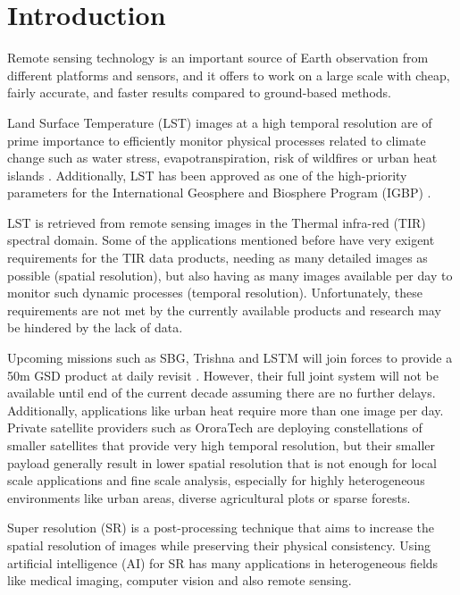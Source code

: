 \section{Introduction} \label{sec:intro}


Remote sensing technology is an important source of Earth observation from different platforms
and sensors, and it offers to work on a large scale with cheap, fairly accurate, and faster results compared to ground-based methods.

Land Surface Temperature (LST) images at a high temporal resolution are of prime importance to efficiently monitor physical processes related to climate change such as water stress, evapotranspiration, risk of wildfires or urban heat islands \cite{lst2005}.
Additionally, LST has been approved as one of the high-priority parameters for the International Geosphere and Biosphere Program (IGBP) \cite{townshend94}.

LST is retrieved from remote sensing images in the Thermal infra-red (TIR) spectral domain.  
Some of the applications mentioned before have very exigent requirements for the TIR data products, needing as many detailed images as possible (spatial resolution), but also having as many images available per day to monitor such dynamic processes (temporal resolution).
Unfortunately, these requirements are not met by the currently available products and research may be hindered by the lack of data.

Upcoming missions such as SBG, Trishna and LSTM will join forces to provide a 50m GSD product at daily revisit \cite{author2023thermal}. However, their full joint system will not be available until end of the current decade assuming there are no further delays. Additionally, applications like urban heat require more than one image per day.
Private satellite providers such as OroraTech are deploying constellations of smaller satellites that provide very high temporal resolution, but their smaller payload generally result in lower spatial resolution that is not enough for local scale applications and fine scale analysis, especially for highly heterogeneous environments like urban areas, diverse agricultural plots or sparse forests.

Super resolution (SR) is a post-processing technique that aims to increase the spatial resolution of images while preserving their physical consistency.
Using artificial intelligence (AI) for SR has many applications in heterogeneous fields like medical imaging, computer vision and also remote sensing. 

